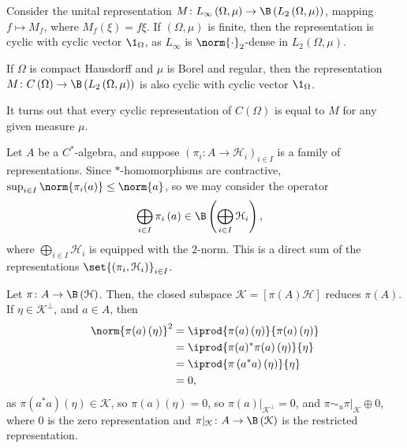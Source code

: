 \documentclass[10pt]{mypackage}
\begin{document}
\begin{example}
  Consider the unital representation $M\colon L_{\infty}\left(\Omega,\mu\right)\rightarrow \B\left(L_2\left(\Omega,\mu\right)\right)$, mapping $f \mapsto M_f$, where $M_f\left(\xi\right) = f\xi$. If $\left(\Omega,\mu\right)$ is finite, then the representation is cyclic with cyclic vector $\1_{\Omega}$, as $L_{\infty}$ is $\norm{\cdot}_2$-dense in $L_2\left(\Omega,\mu\right)$.\newline

  If $\Omega$ is compact Hausdorff and $\mu$ is Borel and regular, then the representation $M\colon C\left(\Omega\right)\rightarrow \B\left(L_2\left(\Omega,\mu\right)\right)$ is also cyclic with cyclic vector $\1_{\Omega}$.\newline

  It turns out that every cyclic representation of $C\left(\Omega\right)$ is equal to $M$ for any given measure $\mu$.
\end{example}
\begin{example}
  Let $A$ be a $C^{\ast}$-algebra, and suppose $\left(\pi_i\colon A\rightarrow \mathcal{H}_i\right)_{i\in I}$ is a family of representations. Since $\ast$-homomorphisms are contractive, $\sup_{i\in I}\norm{\pi_i(a)}\leq \norm{a}$, so we may consider the operator
  \begin{align*}
    \bigoplus_{i\in I}\pi_i\left(a\right) &\in \B\left(\bigoplus_{i\in I}\mathcal{H}_i\right),
  \end{align*}
  where $\bigoplus_{i\in I}\mathcal{H}_i$ is equipped with the $2$-norm. This is a direct sum of the representations $\set{\left(\pi_i,\mathcal{H}_i\right)}_{i\in I}$.
\end{example}
\begin{example}
  Let $\pi\colon A\rightarrow \B\left(\mathcal{H}\right)$. Then, the closed subspace $\mathcal{K} = \left[\pi(A)\mathcal{H}\right]$ reduces $\pi(A)$. If $\eta\in \mathcal{K}^{\perp}$, and $a\in A$, then
  \begin{align*}
    \norm{\pi(a)\left(\eta\right)}^2 &= \iprod{\pi(a)\left(\eta\right)}{\pi(a)\left(\eta\right)}\\
                                     &= \iprod{\pi(a)^{\ast}\pi(a)\left(\eta\right)}{\eta}\\
                                     &= \iprod{\pi\left(a^{\ast}a\right)\left(\eta\right)}{\eta}\\
                                     &= 0,
  \end{align*}
  as $\pi\left(a^{\ast}a\right)\left(\eta\right) \in \mathcal{K}$, so $\pi\left(a\right)\left(\eta\right) = 0$, so $\pi(a)|_{\mathcal{K}^{\perp}} = 0$, and $\pi\sim_{u}\pi|_{\mathcal{K}}\oplus 0$, where $0$ is the zero representation and $\pi|_{\mathcal{K}}\colon A\rightarrow \B\left(\mathcal{K}\right)$ is the restricted representation.
\end{example}
\end{document}
